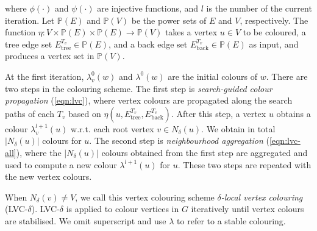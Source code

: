 where $\phi(\cdot)$ and $\psi(\cdot)$ are injective functions, %
and $l$ is the number of the current iteration. 
Let $\mathbb{P}(E)$ and $\mathbb{P}(V)$ be the power sets of $E$ and $V$, respectively. The function $\eta: V \times \mathbb{P}(E) \times \mathbb{P}(E) \rightarrow \mathbb{P}(V)$ takes a vertex $u\in V$ to be coloured, a tree edge set  $E_{\text{tree}}^{T_v}\in \mathbb{P}(E)$, and a back edge set $E_{\text{back}}^{T_v}\in \mathbb{P}(E)$ as input, and produces a vertex set in $\mathbb{P}(V)$. 


At the first iteration, $\lambda^0_v(w)$ and $\lambda^0(w)$ are the initial colours of $w$. There are two steps in the colouring scheme. The first step is \emph{search-guided colour propagation}
(\cref{eqn:lvc}), where vertex colours are propagated along the search paths of each $T_v$ based on $\eta(u, E_{\text{tree}}^{T_v}, E_{\text{back}}^{T_v})$. After this step, a vertex $u$ obtains a colour $\lambda^{l+1}_v(u)$ w.r.t. each root vertex $v\in N_{\delta}(u)$. We obtain in total $|N_{\delta}(u)|$ colours for $u$. The second step is \emph{neighbourhood aggregation} (\cref{eqn:lvc-all}), where the $|N_{\delta}(u)|$ colours obtained from the first step are aggregated and used to compute a new colour $\lambda^{l+1}(u)$ for $u$. These two steps are repeated with the new vertex colours.
 
When $N_\delta(v) \neq V$, we call this vertex colouring scheme \emph{$\delta$-local vertex colouring} (LVC-$\delta$).
LVC-$\delta$ is applied to colour vertices in $G$ iteratively until vertex colours are stabilised.
We omit superscript and use $\lambda$ to refer to a stable colouring.




